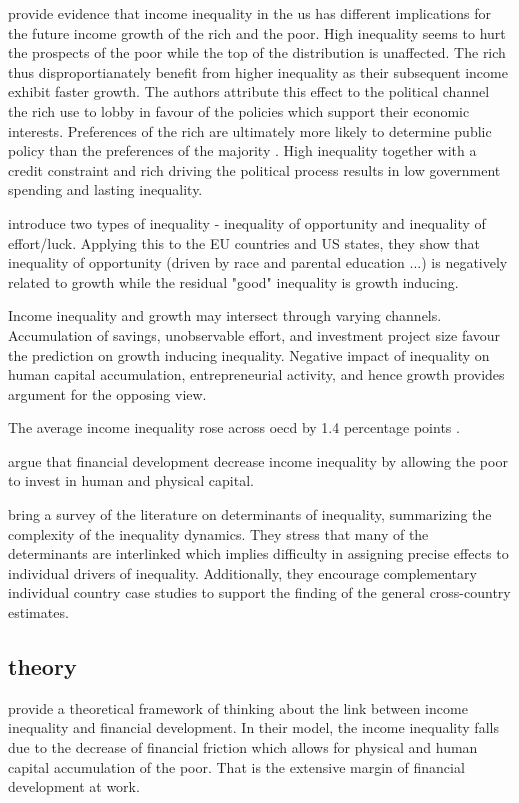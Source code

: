 \documentclass[a4paper,11pt]{article}
\begin{document}
\citet{pikettyandzucman2014}
\citet{van2018inequality} provide evidence that income inequality in the \ac{us} has different implications for the future income growth of the rich and the poor. High inequality seems to hurt the prospects of the poor while the top of the distribution is unaffected. The rich thus disproportianately benefit from higher inequality as their subsequent income exhibit faster growth. The authors attribute this effect to the political channel the rich use to lobby in favour of the policies which support their economic interests. Preferences of the rich are ultimately more likely to determine public policy than the preferences of the majority \citep{gilens_page_2014}. High inequality together with a credit constraint and rich driving the political process results in low government spending and lasting inequality.

\citet{marrero2013inequality} introduce two types of inequality - inequality of opportunity and inequality of effort/luck. Applying this to the EU countries and US states, they show that inequality of opportunity (driven by race and parental education ...) is negatively related to growth while the residual "good" inequality is growth inducing.

Income inequality and growth may intersect through varying channels. Accumulation of savings, unobservable effort, and investment project size favour the prediction on growth inducing inequality. Negative impact of inequality on human capital accumulation, entrepreneurial activity, and hence growth provides argument for the opposing view.

The average income inequality rose across \ac{oecd} by 1.4 percentage points \citep{oecd2013crisis}.

\citet{LawSingh2014} argue that financial development decrease income inequality by allowing the poor to invest in human and physical capital.

\citet{nolan2019drivers} bring a survey of the literature on determinants of inequality, summarizing the complexity of the inequality dynamics. They stress that many of the determinants are interlinked which implies difficulty in assigning precise effects to individual drivers of inequality. Additionally, they encourage complementary individual country case studies to support the finding of the general cross-country estimates.

\subsection{theory}
\citet{galormoav2004} provide a theoretical framework of thinking about the link between income inequality and financial development. In their model, the income inequality falls due to the decrease of financial friction which allows for physical and human capital accumulation of the poor. That is the extensive margin of financial development at work.
\end{document}
